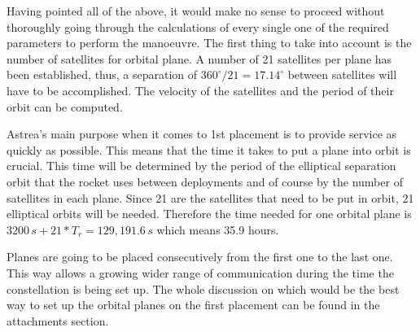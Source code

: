 Having pointed all of the above, it would make no sense to proceed without thoroughly going through the calculations of every single one of the required parameters to perform the manoeuvre. The first thing to take into account is the number of satellites for orbital plane. A number of 21 satellites per plane has been established, thus, a separation of $360^\circ/21 = 17.14^\circ$ between satellites will have to be accomplished. The velocity of the satellites and the period of their orbit can be computed. %

Astrea's main purpose when it comes to 1st placement is to provide service as quickly as possible. This means that the time it takes to put a plane into orbit is crucial. This time will be determined by the period of the elliptical separation orbit that the rocket uses between deployments and of course by the number of satellites in each plane. Since 21 are the satellites that need to be put in orbit, 21 elliptical orbits will be needed. Therefore the time needed for one orbital plane is $3200\,s + 21*T_r = 129,191.6\,s$ which means 35.9 hours.

Planes are going to be placed consecutively from the first one to the last one. This way allows a growing wider range of communication during the time the constellation is being set up. The whole discussion on which would be the best way to set up the orbital planes on the first placement can be found in the attachments section.